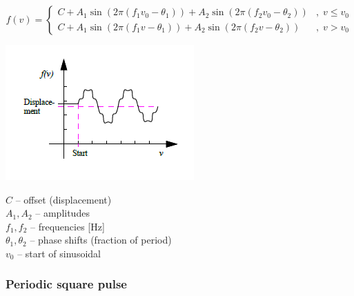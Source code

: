 $$
  f(v)=\left\{\begin{array}{ll}
    C+A_1\sin(2\pi(f_1v_0-\theta_1)) + A_2\sin(2\pi(f_2v_0-\theta_2))
    &,\; v \leq v_0 \\
    C+A_1\sin(2\pi(f_1v-\theta_1)) + A_2\sin(2\pi(f_2v-\theta_2))
    &,\; v > v_0
  \end{array}\right.
$$
\noindent
\begin{minipage}{0.45\textwidth}
  \includegraphics[width=\textwidth]{Figures/4-Functions-delayedSine}
\end{minipage}%
\hfill\begin{minipage}{0.5\textwidth}
  $C$ -- offset (displacement) \\
  $A_1, A_2$ -- amplitudes \\
  $f_1, f_2$ -- frequencies [Hz] \\
  $\theta_1, \theta_2$ -- phase shifts (fraction of period) \\
  $v_0$ -- start of sinusoidal
\end{minipage}

\subsubsection{Periodic square pulse}

